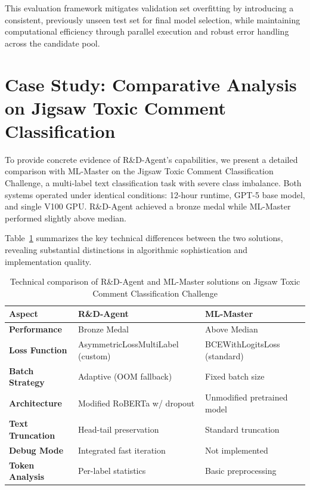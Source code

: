 This evaluation framework mitigates validation set overfitting by introducing a consistent, previously unseen test set for final model selection, while maintaining computational efficiency through parallel execution and robust error handling across the candidate pool.


\section{Case Study: Comparative Analysis on Jigsaw Toxic Comment Classification}

To provide concrete evidence of R\&D-Agent's capabilities, we present a detailed comparison with ML-Master on the Jigsaw Toxic Comment Classification Challenge, a multi-label text classification task with severe class imbalance. Both systems operated under identical conditions: 12-hour runtime, GPT-5 base model, and single V100 GPU. R\&D-Agent achieved a bronze medal while ML-Master performed slightly above median.

Table~\ref{tab:comparison} summarizes the key technical differences between the two solutions, revealing substantial distinctions in algorithmic sophistication and implementation quality.

\begin{table}[!htbp]
\centering
\caption{Technical comparison of R\&D-Agent and ML-Master solutions on Jigsaw Toxic Comment Classification Challenge}
\label{tab:comparison}
\renewcommand{\arraystretch}{1.2}
\begin{tabular}{lll}
\toprule
\textbf{Aspect} & \textbf{R\&D-Agent} & \textbf{ML-Master} \\
\midrule
\textbf{Performance} & Bronze Medal & Above Median \\
\textbf{Loss Function} & AsymmetricLossMultiLabel (custom) & BCEWithLogitsLoss (standard) \\
\textbf{Batch Strategy} & Adaptive (OOM fallback) & Fixed batch size \\
\textbf{Architecture} & Modified RoBERTa w/ dropout & Unmodified pretrained model \\
\textbf{Text Truncation} & Head-tail preservation & Standard truncation \\
\textbf{Debug Mode} & Integrated fast iteration & Not implemented \\
\textbf{Token Analysis} & Per-label statistics & Basic preprocessing \\
\bottomrule
\end{tabular}
\end{table}

